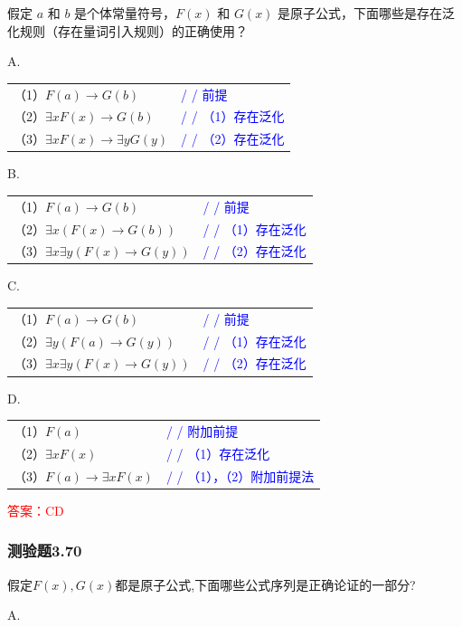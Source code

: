 \documentclass[UTF8, heading=true]{ctexart}
\begin{document}
假定 $a$ 和 $b$ 是个体常量符号，$F(x)$ 和 $G(x)$ 是原子公式，下面哪些是存在泛化规则（存在量词引入规则）的正确使用？


A.

\begin{tabular}{ll}
  （1）$F(a) \rightarrow G(b)$ & \textcolor{blue}{/ / 前提} \\
  （2）$\exists x F(x) \rightarrow G(b)$ & \textcolor{blue}{/ / （1）存在泛化} \\
  （3）$\exists x F(x) \rightarrow \exists y G(y)$ & \textcolor{blue}{/ / （2）存在泛化}
\end{tabular}

B.

\begin{tabular}{ll}
  （1）$F(a) \rightarrow G(b)$ & \textcolor{blue}{/ / 前提} \\
  （2）$\exists x(F(x) \rightarrow G(b))$ & \textcolor{blue}{/ / （1）存在泛化} \\
  （3）$\exists x \exists y(F(x) \rightarrow G(y))$ & \textcolor{blue}{/ / （2）存在泛化}
\end{tabular}

C.

\begin{tabular}{ll}
  （1）$F(a) \rightarrow G(b)$ & \textcolor{blue}{/ / 前提} \\
  （2）$\exists y(F(a) \rightarrow G(y))$ & \textcolor{blue}{/ / （1）存在泛化} \\
  （3）$\exists x \exists y(F(x) \rightarrow G(y))$ & \textcolor{blue}{/ / （2）存在泛化}
\end{tabular}


D.

\begin{tabular}{ll}
  （1）$F(a)$ & \textcolor{blue}{/ / 附加前提} \\
  （2）$\exists x F(x)$ & \textcolor{blue}{/ / （1）存在泛化} \\
  （3）$F(a) \rightarrow \exists x F(x)$ & \textcolor{blue}{/ / （1），（2）附加前提法}
\end{tabular}


\textcolor{red}{答案：CD}


\subsubsection{测验题3.70}

假定$F(x),G(x)$都是原子公式,下面哪些公式序列是正确论证的一部分?

A.
\end{document}
